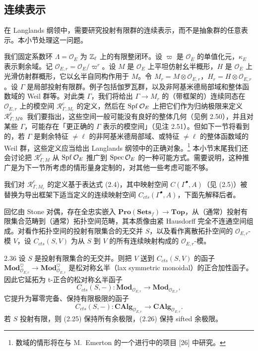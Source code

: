 \subsection{连续表示}

在 Langlands 纲领中，需要研究投射有限群的连续表示，而不是抽象群的任意表示。本小节处理这一问题。

我们固定系数环 $\Lambda = \mathcal O_E$ 为 $\mathbb{Z}_\ell$ 上的有限整闭环。设 $\varpi$ 是 $\mathcal O_E$ 的单值化元，$\kappa_E$ 表示剩余域。记 $\mathcal O_{E,r} = \mathcal O_E/\varpi^r$。设 $M$ 是 $\mathcal O_E$ 上平坦仿射幺半概形，$H$ 是 $\mathcal O_E$ 上光滑仿射群概形，它以幺半自同构作用于 $M$。令 $M_r = M\otimes\mathcal O_{E,r}$，$H_r = H\otimes\mathcal O_{E,r}$。设 $\Gamma$ 是局部投射有限群。例子包括伽罗瓦群，以及非阿基米德局部域和整体函数域的 Weil 群等。对此类 $\Gamma$，我们将给出 $\Gamma \to M_r$ 的（带框架的）连续同态在 $\mathcal O_{E,r}$ 上的模空间 $\mathcal R^c_{\Gamma,M_r}$ 的定义，然后在 $\operatorname{Spf}\mathcal O_E$ 上把它们作为归纳极限来定义 $\mathcal R^c_{\Gamma,M}$。我们要指出，这些空间一般可能没有良好的整体几何（见例 2.50），并且对某些 $\Gamma$，可能存在「更正确的 $\Gamma$ 表示的模空间」（见注 2.51）。但如下一节将看到的，若 $\Gamma$ 是剩余特征 $\neq\ell$ 的非阿基米德局部域、或特征 $\neq\ell$ 的整体函数域的 Weil 群，这些定义应当给出 Langlands 纲领中的正确对象。\footnote{数域的情形将在与 M.\ Emerton 的一个进行中的项目 [26] 中研究。} 本小节末尾我们还会讨论把 $\mathcal R^c_{\Gamma,M}$ 从 $\operatorname{Spf}\mathcal O_E$ 推广到 $\operatorname{Spec}\mathcal O_E$ 的一种可能方式。需要说明，这种推广是为下一节所考虑的情形量身定制的，对其他一些考虑可能不够。

我们对 $\mathcal R^c_{\Gamma,M_r}$ 的定义基于表达式 (2.4)，其中映射空间 $C(\Gamma^\bullet,A)$（见 (2.5)）被替换为导出框架下适当定义的连续映射空间 $C_{cts}(\Gamma^\bullet,A)$，下面先解释后者。

回忆由 Stone 对偶，存在全忠实嵌入 $\mathbf{Pro}(\mathbf{Sets}_f) \to \mathbf{Top}$，从（通常）投射有限集合范畴到（通常）拓扑空间范畴，其本质像由紧 Hausdorff 完全不连通空间组成。对看作拓扑空间的投射有限集合的无交并 $S$，以及看作离散拓扑空间的 $\mathcal O_{E,r}$-模 $V$，设 $C_{cts}(S,V)$ 为从 $S$ 到 $V$ 的所有连续映射构成的 $\mathcal O_{E,r}$-模。

\begin{lem}{2.36}
设 $S$ 是投射有限集合的无交并。则把 $V$ 送到 $C_{cts}(S,V)$ 的函子 $\mathbf{Mod}^\heartsuit_{\mathcal O_{E,r}} \to \mathbf{Mod}^\heartsuit_{\mathcal O_{E,r}}$ 是松对称幺半（lax symmetric monoidal）的正合加性函子。因此它延拓为 t-正合的松对称幺半函子
\begin{equation}
\tag{2.25}
C_{cts}(S,-)\colon \mathbf{Mod}_{\mathcal O_{E,r}} \to \mathbf{Mod}_{\mathcal O_{E,r}},
\end{equation}
它提升为幂零完备、保持有限极限的函子
\begin{equation}
\tag{2.26}
C_{cts}(S,-)\colon \mathbf{CAlg}_{\mathcal O_{E,r}} \to \mathbf{CAlg}_{\mathcal O_{E,r}} .
\end{equation}
若 $S$ 投射有限，则 (2.25) 保持所有余极限，(2.26) 保持 sifted 余极限。
\label{lem:zhu2-2-36}
\end{lem}

